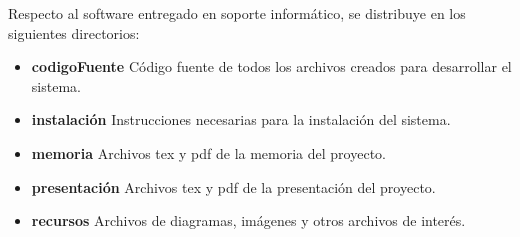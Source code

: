 Respecto al software entregado en soporte informático, se distribuye en los siguientes directorios:

\begin{itemize}
	\item \textbf{codigoFuente}	Código fuente de todos los archivos creados para desarrollar el sistema.
	\item \textbf{instalación}	Instrucciones necesarias para la instalación del sistema.
	\item \textbf{memoria}	Archivos tex y pdf de la memoria del proyecto.
	\item \textbf{presentación}	Archivos tex y pdf de la presentación del proyecto.
	\item \textbf{recursos}	Archivos de diagramas, imágenes y otros archivos de interés.
\end{itemize}